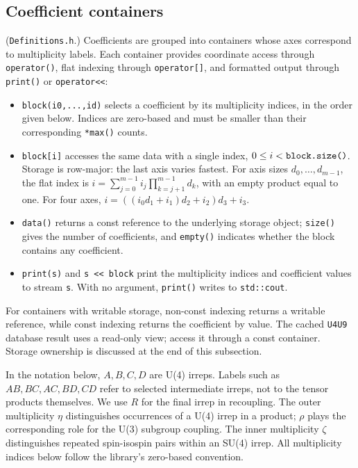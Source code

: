 \documentclass[aps,onecolumn,10pt,superscriptaddress,floatfix,nofootinbib]{revtex4}
\begin{document}
\subsection{Coefficient containers}
(\verb|Definitions.h|.) Coefficients are grouped into containers whose axes
correspond to multiplicity labels. Each container provides coordinate access
through \verb|operator()|, flat indexing through \verb|operator[]|, and
formatted output through \verb|print()| or \verb|operator<<|:
\begin{itemize}
    \item \verb|block(i0,...,id)| selects a coefficient by its multiplicity indices,
    in the order given below. Indices are zero-based and must be smaller than
    their corresponding \verb|*max()| counts.
    \item \verb|block[i]| accesses the same data with a single index,
    $0\leq i<\verb|block.size()|$. Storage is row-major: the last axis varies
    fastest. For axis sizes $d_0,\ldots,d_{m-1}$, the flat index is
    $i=\sum_{j=0}^{m-1}i_j\prod_{k=j+1}^{m-1}d_k$, with an empty product equal
    to one. For four axes, $i=((i_0d_1+i_1)d_2+i_2)d_3+i_3$.
    \item \verb|data()| returns a const reference to the underlying storage
    object; \verb|size()| gives the number of coefficients, and \verb|empty()|
    indicates whether the block contains any coefficient.
    \item \verb|print(s)| and \verb|s << block| print the multiplicity indices
    and coefficient values to stream \verb|s|. With no argument,
    \verb|print()| writes to \verb|std::cout|.
\end{itemize}
For containers with writable storage, non-const indexing returns a writable
reference, while const indexing returns the coefficient by value. The cached
\verb|U4U9| database result uses a read-only view; access it through a const
container. Storage ownership is discussed at the end of this subsection.

In the notation below, $A,B,C,D$ are U(4) irreps. Labels such as $AB,BC,AC,BD,CD$
refer to selected intermediate irreps, not to the tensor products themselves.
We use $R$ for the final irrep in recoupling.
The outer multiplicity $\eta$ distinguishes occurrences of a U(4) irrep in a
product; $\rho$ plays the corresponding role for the U(3) subgroup coupling.
The inner multiplicity $\zeta$ distinguishes repeated spin-isospin pairs within
an SU(4) irrep. All multiplicity indices below follow the library's zero-based
convention.
\end{document}
